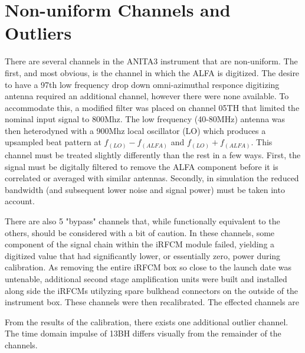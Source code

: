 \section{Non-uniform Channels and Outliers}
	There are several channels in the ANITA3 instrument that are non-uniform.  The first, and most obvious, is the channel in which the ALFA is digitized.  The desire to have a 97th low frequency drop down omni-azimuthal responce digitizing antenna required an additional channel, however there were none available.  To accommodate this, a modified filter was placed on channel 05TH that limited the nominal input signal to 800Mhz.  The low frequency (40-80MHz) antenna was then heterodyned with a 900Mhz local oscillator (LO) which produces a upsampled beat pattern at $f_(LO)-f_(ALFA)$ and $f_(LO)+f_(ALFA)$. This channel must be treated slightly differently than the rest in a few ways.  First, the signal must be digitally filtered to remove the ALFA component before it is correlated or averaged with similar antennas.  Secondly, in simulation the reduced bandwidth (and subsequent lower noise and signal power) must be taken into account.
	
	There are also 5 "bypass" channels that, while functionally equivalent to the others, should be considered with a bit of caution.  In these channels, some component of the signal chain within the iRFCM module failed, yielding a digitized value that had significantly lower, or essentially zero, power during calibration.  As removing the entire iRFCM box so close to the launch date was untenable, additional second stage amplification units were built and installed along side the iRFCMs utilyzing spare bulkhead connectors on the outside of the instrument box.  These channels were then recalibrated.  The effected channels are 

	From the results of the calibration, there exists one additional outlier channel.  The time domain impulse of 13BH differs visually from the remainder of the channels.  

